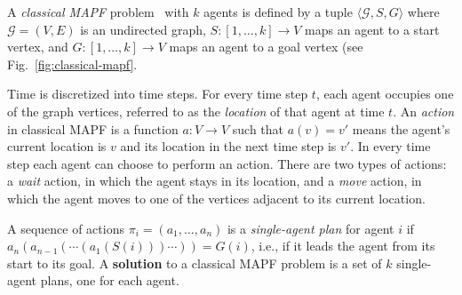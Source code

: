 \documentclass[review]{elsarticle}
\newcommand{\target}{\ensuremath{G}\xspace}
\newcommand{\source}{\ensuremath{S}\xspace}
\newcommand\konstantin[1]{\nb{\textbf{Konstantin:}}{red}{#1}}
\newcommand\roni[1]{\nb{\textbf{Roni:}}{green}{#1}}
\newcommand\dor[1]{\nb{\textbf{Dor:}}{Fuchsia}{#1}}
\begin{document}
A \emph{classical MAPF} problem~\cite{stern2019mapf} with $k$ agents is defined by 
a tuple $\langle \mathcal{G}, \source,\target \rangle$ 
where $\mathcal{G}=(V,E)$ is an undirected graph, 
$\source:[1,\ldots,k]\rightarrow V$ maps an agent to a start vertex, 
and $\target:[1,\ldots,k]\rightarrow V$ maps an agent to a goal vertex (see Fig.~\ref{fig:classical-mapf}.

Time is discretized into time steps. 
For every time step $t$, each agent occupies one of the graph vertices, referred to as the \emph{location} of that agent at time $t$.
An \emph{action} in classical MAPF is a function $a: V\rightarrow V$ 
such that $a(v)=v'$ means the agent's current location is $v$ and its location in the next time step is $v'$. %
In every time step each agent can choose to perform an action. 
There are two types of actions: a \emph{wait} action, in which the agent stays in its location, and a \emph{move} action, in which the agent moves to one of the vertices adjacent to its current location. 




A sequence of actions $\pi_i=(a_1,\ldots,a_n)$ 
is a \emph{single-agent plan} for agent $i$ 
if $a_n(a_{n-1}(\cdots(a_1(\source(i)))\cdots))=\target(i)$, i.e., if it leads the agent from its start to its goal. A \textbf{solution} to a classical MAPF problem is a set of $k$ single-agent plans, one for each agent.  

\end{document}
